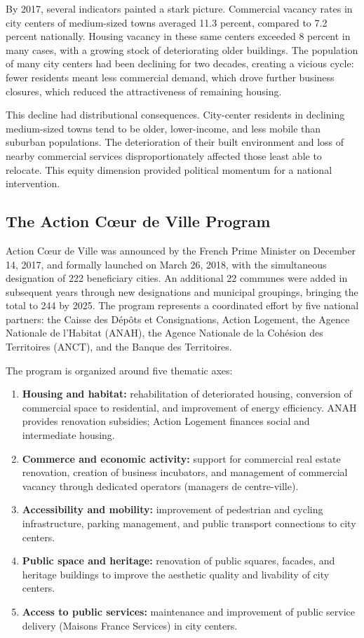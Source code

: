 \documentclass[12pt]{article}
\begin{document}
By 2017, several indicators painted a stark picture. Commercial vacancy rates in city centers of medium-sized towns averaged 11.3 percent, compared to 7.2 percent nationally. Housing vacancy in these same centers exceeded 8 percent in many cases, with a growing stock of deteriorating older buildings. The population of many city centers had been declining for two decades, creating a vicious cycle: fewer residents meant less commercial demand, which drove further business closures, which reduced the attractiveness of remaining housing.

This decline had distributional consequences. City-center residents in declining medium-sized towns tend to be older, lower-income, and less mobile than suburban populations. The deterioration of their built environment and loss of nearby commercial services disproportionately affected those least able to relocate. This equity dimension provided political momentum for a national intervention.

\subsection{The Action C\oe ur de Ville Program}

Action C\oe ur de Ville was announced by the French Prime Minister on December 14, 2017, and formally launched on March 26, 2018, with the simultaneous designation of 222 beneficiary cities. An additional 22 communes were added in subsequent years through new designations and municipal groupings, bringing the total to 244 by 2025. The program represents a coordinated effort by five national partners: the Caisse des D\'{e}p\^{o}ts et Consignations, Action Logement, the Agence Nationale de l'Habitat (ANAH), the Agence Nationale de la Coh\'{e}sion des Territoires (ANCT), and the Banque des Territoires.

The program is organized around five thematic axes:
\begin{enumerate}
    \item \textbf{Housing and habitat:} rehabilitation of deteriorated housing, conversion of commercial space to residential, and improvement of energy efficiency. ANAH provides renovation subsidies; Action Logement finances social and intermediate housing.
    \item \textbf{Commerce and economic activity:} support for commercial real estate renovation, creation of business incubators, and management of commercial vacancy through dedicated operators (managers de centre-ville).
    \item \textbf{Accessibility and mobility:} improvement of pedestrian and cycling infrastructure, parking management, and public transport connections to city centers.
    \item \textbf{Public space and heritage:} renovation of public squares, facades, and heritage buildings to improve the aesthetic quality and livability of city centers.
    \item \textbf{Access to public services:} maintenance and improvement of public service delivery (Maisons France Services) in city centers.
\end{enumerate}
\end{document}
